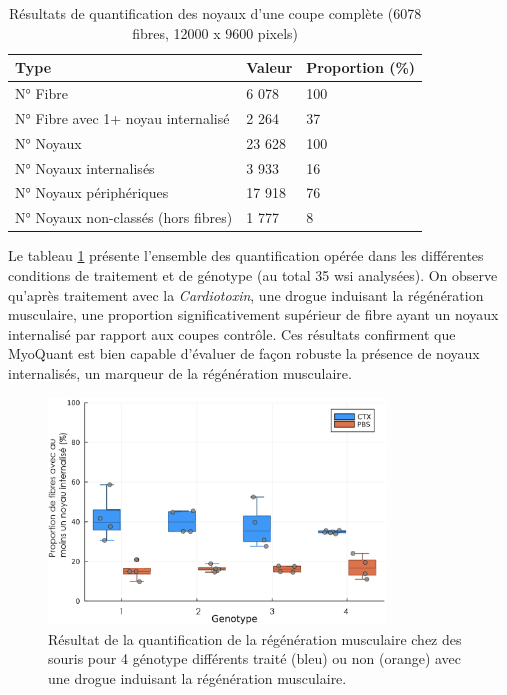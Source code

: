 \begin{table}[ht]
\centering
\caption{Résultats de quantification des noyaux d'une coupe complète (6078 fibres, 12000 x 9600 pixels)}
\label{tab:myoquant_fluo_results}
\begin{tabularx}{\textwidth}{|X|X|X|}
\hline
\textbf{Type} & \textbf{Valeur} & \textbf{Proportion (\%)} \\
\toprule
N° Fibre & 6 078 & 100 \\
\hline
N° Fibre avec 1+ noyau internalisé & 2 264 & 37 \\
\hline
\hline
N° Noyaux & 23 628 & 100 \\
\hline
N° Noyaux internalisés & 3 933 & 16 \\
\hline
N° Noyaux périphériques & 17 918 & 76 \\
\hline
N° Noyaux non-classés (hors fibres) & 1 777 & 8 \\
\hline
\end{tabularx}
\end{table}
Le tableau \ref{fig:fluo_compil} présente l'ensemble des quantification opérée dans les différentes conditions de traitement et de génotype (au total 35 \gls{wsi} analysées). On observe qu'après traitement avec la \textit{Cardiotoxin}, une drogue induisant la régénération musculaire, une proportion significativement supérieur de fibre ayant un noyaux internalisé par rapport aux coupes contrôle. Ces résultats confirment que MyoQuant est bien capable d'évaluer de façon robuste la présence de noyaux internalisés, un marqueur de la régénération musculaire.

\begin{figure}[htbp]
 \centering
 \includegraphics[width=0.8\textwidth]{figures/fluo_compil.png}
 \caption[Résultat de la quantification de la régénération musculaire]{Résultat de la quantification de la régénération musculaire chez des souris pour 4 génotype différents traité (bleu) ou non (orange) avec une drogue induisant la régénération musculaire.}
 \label{fig:fluo_compil}
\end{figure}

